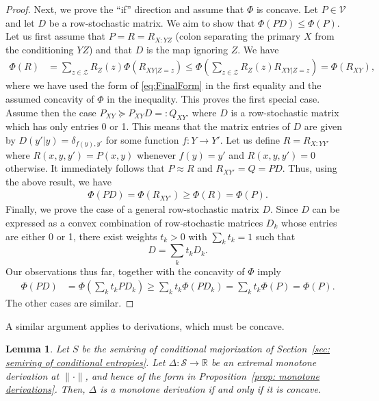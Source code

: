 \documentclass[aps,pra,11pt,onecolumn,nofootinbib,tightenlines]{revtex4-2}
\newtheorem{lemma}[theorem]{Lemma}
\theoremstyle{definition}
\newcommand{\mc}[1]{\mathcal{#1}}
\begin{document}
\begin{proof}
Next, we prove the “if” direction and assume that $\Phi$ is concave. Let $P \in \mathcal{V}$ and let $D$ be a row-stochastic matrix. We aim to show that $\Phi(PD) \leq \Phi(P)$. Let us first assume that $P=R=R_{X:YZ}$ (colon separating the primary $X$ from the conditioning $YZ$) and that $D$ is the map ignoring $Z$. %
We have
\begin{align}
\Phi(R)&=\sum_{z\in\mc Z}R_Z(z)\Phi(R_{XY|Z=z})\leq\Phi\left(\sum_{z\in\mc Z}R_Z(z)R_{XY|Z=z}\right)=\Phi(R_{XY}),
\end{align}
where we have used the form of \eqref{eq:FinalForm} in the first equality and the assumed concavity of $\Phi$ in the inequality. This proves the first special case. Assume then the case $P_{XY}\succeq P_{XY}D=:Q_{XY'}$ where $D$ is a row-stochastic matrix which has only entries 0 or 1. This means that the matrix entries of $D$ are given by $D(y'|y)=\delta_{f(y),y'}$ for some function $f:Y\to Y'$. Let us define $R=R_{X:YY'}$ where $R(x,y,y')=P(x,y)$ whenever $f(y)=y'$ and $R(x,y,y')=0$ otherwise. It immediately follows that $P\approx R$ and $R_{XY'}=Q=PD$. Thus, using the above result, we have
\begin{align}
\Phi(PD)=\Phi(R_{XY'})\geq\Phi(R)=\Phi(P).
\end{align}
Finally, we prove the case of a general row-stochastic matrix $D$. Since $D$ can be expressed as a convex combination of row-stochastic matrices $D_k$ whose entries are either 0 or 1, there exist weights $t_k > 0$ with $\sum_k t_k = 1$
such that
\begin{equation}
    D = \sum_k t_k D_k.
\end{equation}
Our observations thus far, together with the concavity of $\Phi$ imply
\begin{align}\label{eq:apuconv}
\Phi(PD)&=\Phi\left(\sum_k t_kPD_k\right)\geq\sum_k t_k\Phi(PD_k)=\sum_k t_k\Phi(P)=\Phi(P).
\end{align}
The other cases are similar.
\end{proof}

A similar argument applies to derivations, which must be concave.

\begin{lemma}
\label{lem: conv derivations}
Let $S$ be the semiring of conditional majorization of Section~\ref{sec: semiring of conditional entropies}. Let $\Delta: \mathcal{S} \to \mathbb{R}$ be an extremal monotone derivation at $\|\cdot\|$, and hence of the form in Proposition~\ref{prop: monotone derivations}.
Then, $\Delta$ is a monotone derivation if and only if it is concave.
\end{lemma}
\end{document}
